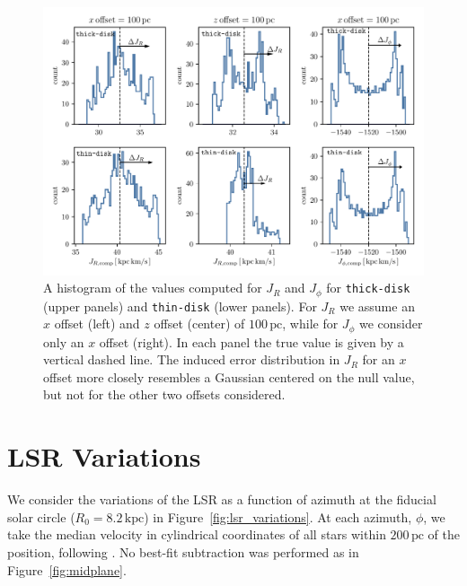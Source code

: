 \documentclass[twocolumn]{aastex62}
\newcommand{\pc}{\text{pc}}
\newcommand{\kpc}{\text{kpc}}
\newcommand{\thin}{\texttt{thin-disk}}
\newcommand{\thick}{\texttt{thick-disk}}
\begin{document}
\begin{figure}
\begin{center}
\includegraphics[width=7.10000594991in]{fig/schmactions_Jphi_JR_hist.pdf}
\end{center}
\caption{A histogram of the values computed for $J_R$ and $J_{\phi}$ for
\thick{} (upper panels) and \thin{} (lower panels). For $J_R$ we assume an
$x$ offset (left) and $z$ offset (center) of $100\,\pc$, while for $J_{\phi}$
we consider only an $x$ offset (right). In each panel the true value is given
by a vertical dashed line. The induced error distribution in $J_R$ for an $x$
offset more closely resembles a Gaussian centered on the null value, but not
for the other two offsets considered.}
\label{fig:Jphi_JR_hist}
\end{figure}

\section{LSR Variations} \label{app:lsr}
We consider the variations of the LSR as a function of azimuth at the fiducial
solar circle ($R_{0} = 8.2\,\kpc$) in Figure~\ref{fig:lsr_variations}. At
each azimuth, $\phi$, we take the median velocity in cylindrical coordinates
of all stars within $200\,\pc$ of the position, following
\citet{2018arXiv180610564S}. No best-fit subtraction was performed as in
Figure~\ref{fig:midplane}.
\end{document}

